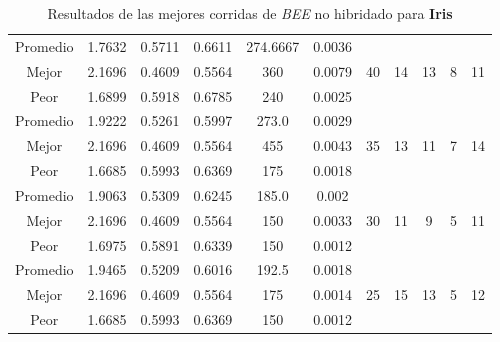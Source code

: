 \begin{table}[h!]
\begin{center}
\begin{tabular}{|c|c|c|c|c|c|c|c|c|c|c|}
        \hline
        \hline
            Promedio  & 1.7632 & 0.5711 & 0.6611 & 274.6667 & 0.0036 &  &  &  &  & \\
            \cline{1-6}
            Mejor & 2.1696 & 0.4609  & 0.5564 & 360 & 0.0079 & 40 & 14 & 13 & 8 & 11\\
            \cline{1-6}
            Peor & 1.6899 & 0.5918  & 0.6785 & 240 & 0.0025 &  &  &  &  & \\
        \hline
        \hline
            Promedio  & 1.9222 & 0.5261 & 0.5997 & 273.0 & 0.0029 &  &  &  &  & \\
            \cline{1-6}
            Mejor & 2.1696 & 0.4609  & 0.5564 & 455 & 0.0043 & 35 & 13 & 11 & 7 & 14\\
            \cline{1-6}
            Peor & 1.6685 & 0.5993  & 0.6369 & 175 & 0.0018 &  &  &  &  & \\
        \hline
        \hline
            Promedio  & 1.9063 & 0.5309 & 0.6245 & 185.0 & 0.002 &  &  &  &  & \\
            \cline{1-6}
            Mejor & 2.1696 & 0.4609  & 0.5564 & 150 & 0.0033 & 30 & 11 & 9 & 5 & 11\\
            \cline{1-6}
            Peor & 1.6975 & 0.5891  & 0.6339 & 150 & 0.0012 &  &  &  &  & \\
        \hline
        \hline
            Promedio  & 1.9465 & 0.5209 & 0.6016 & 192.5 & 0.0018 &  &  &  &  & \\
            \cline{1-6}
            Mejor & 2.1696 & 0.4609  & 0.5564 & 175 & 0.0014 & 25 & 15 & 13 & 5 & 12\\
            \cline{1-6}
            Peor & 1.6685 & 0.5993  & 0.6369 & 150 & 0.0012 &  &  &  &  & \\
        \hline
        \end{tabular}
        \caption{Resultados de las mejores corridas de \emph{BEE} no hibridado para {\bf Iris}}
        \label{tb:tablebeealgcsv}
    \end{center}
\end{table}


